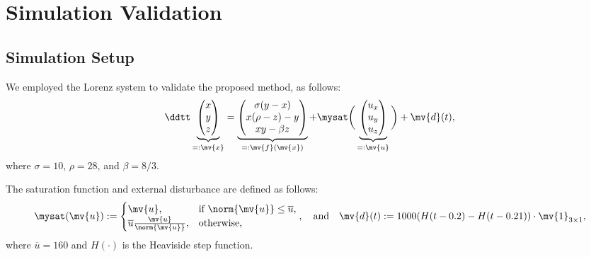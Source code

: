 \section{Simulation Validation}

\subsection{Simulation Setup}

\begin{frame}{\insertsubsectionhead}{}
  
  We employed the Lorenz system to validate the proposed method, as follows:
  \begin{equation}
    \ddtt
    \underbrace{
      \begin{pmatrix}
        x\\y\\z
      \end{pmatrix}
    }_{=:\mv{x}}
    =
    \underbrace{
      \begin{pmatrix}
        \sigma(y-x)
        \\
        x(\rho-z)-y
        \\
        xy-\beta z
      \end{pmatrix}
    }_{=:\mv{f}(\mv{x})}
    +
    \mysat
    \bigg(
      \underbrace{
        \begin{pmatrix}
            u_x\\u_y\\u_z
        \end{pmatrix}
      }_{=:\mv{u}}
    \bigg)
    +
    \mv{d}(t)
    ,
  \end{equation}
  where $\sigma=10$, $\rho=28$, and $\beta=8/3$.

  The saturation function and external disturbance are defined as follows:
  \begin{equation}
    \mysat(\mv{u})
    :=
    \begin{cases}
      \mv{u}
      ,
      & \text{if } \norm{\mv{u}} \le \overline{u}
      ,
      \\
      \overline{u} \tfrac{\mv{u}}{\norm{\mv{u}}}
      ,
      & \text{otherwise}
      ,
    \end{cases}
    ,
    \quad
    \text{and}
    \quad
    \mv{d}(t)
    :=
    1000 (H(t-0.2)-H(t-0.21))
    \cdot
    \mv{1}_{3\times1}
    ,
  \end{equation}
  where $\overline{u}=160$ and $H(\cdot)$ is the Heaviside step function.


\end{frame}
